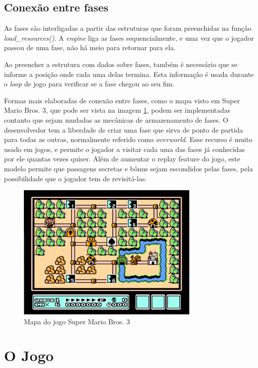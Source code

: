 \documentclass[brazil]{abnt}
\begin{document}
\section{Conexão entre fases}

As fases são interligadas a partir das estruturas que foram preenchidas na função \textit{load\_resources()}. A \textit{engine} liga as fases sequencialmente, e uma vez que o jogador passou de uma fase, não há meio para retornar para ela.

Ao preencher a estrutura com dados sobre fases, também é necessário que se informe a posição onde cada uma delas termina. Esta informação é usada durante o \textit{loop} de jogo para verificar se a fase chegou ao seu fim.

Formas mais elaboradas de conexão entre fases, como o mapa visto em Super Mario Bros. 3, que pode ser vista na imagem \ref{fig:smb3}, podem ser implementadas contanto que sejam mudadas as mecânicas de armazenamento de fases. O desenvolvedor tem a liberdade de criar uma fase que sirva de ponto de partida para todas as outras, normalmente referido como \textit{overworld}. Esse recurso é muito usado em jogos, e permite o jogador a visitar cada uma das fases já conhecidas por ele quantas vezes quiser. Além de aumentar o replay feature do jogo, este modelo permite que passagens secretas e bônus sejam escondidos pelas fases, pela possibilidade que o jogador tem de revisitá-las.

\begin{figure}[h!]
\centering
\includegraphics{imgs/smb3.png}
\caption{Mapa do jogo Super Mario Bros. 3}
\label{fig:smb3}
\end{figure}

\chapter{O Jogo}
\end{document}
